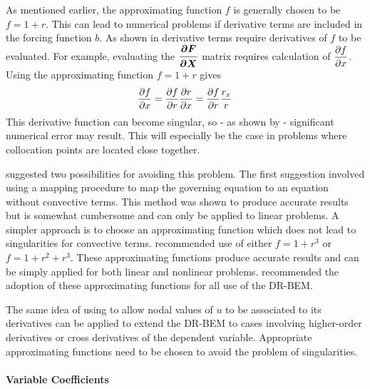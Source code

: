 As mentioned earlier, the approximating function $f$ is generally chosen to be
$f = 1 + r$.  This can lead to numerical problems if derivative terms are
included in the forcing function $b$.  As shown in 
derivative terms require derivatives of $f$ to be evaluated.  For example,
evaluating the $\matr{\delby{F}{x}}$ matrix requires calculation of
$ \dfrac{\partial f}{\partial x} $.  Using the approximating function $f = 1 + r$ gives
\begin{equation}
   \dfrac{\partial f}{\partial x}  =  \dfrac{\partial f}{\partial r}   \dfrac{\partial r}{\partial x}  =  \dfrac{\partial f}{\partial r}  \dfrac{r_{x}}{r} 
\end{equation}
This derivative function can become singular, so - as shown by
\citet{zhang:1993} - significant numerical error may result.  This
will especially be the case in problems where collocation points are located
close together.

\citet{zhang:1993} suggested two possibilities for avoiding this
problem.  The first suggestion involved using a mapping procedure to map
the governing equation to an equation without convective terms. This method
was shown to produce accurate results but is somewhat cumbersome and can
only be applied to linear problems.  A simpler approach is to choose an
approximating function which does not lead to singularities for convective
terms.  \citet{zhang:1993} recommended use of either $f = 1 + r^{3}$
or $f = 1 + r^{2}+ r^{3}$.  These approximating functions produce accurate
results and can be simply applied for both linear and nonlinear problems.
\citet{zhang:1993} recommended the adoption of these approximating
functions for all use of the DR-BEM.

The same idea of using  to allow nodal values of $u$ to be
associated to its derivatives can be applied to extend the DR-BEM to cases
involving higher-order derivatives or cross derivatives of the dependent
variable.  Appropriate approximating functions need to be chosen to avoid
the problem of singularities.

\paragraph{Variable Coefficients}

